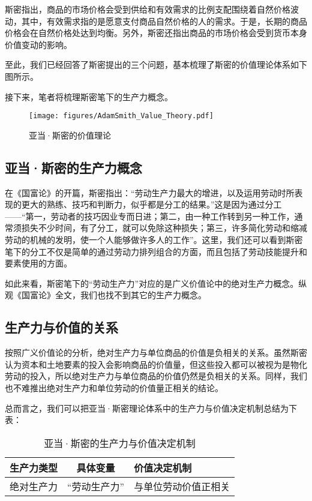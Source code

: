 斯密指出，商品的市场价格会受到供给和有效需求的比例支配围绕着自然价格波动，其中，有效需求指的是愿意支付商品自然价格的人的需求\cite[50]{YaDang*SiMiGuoFuLun2015}。于是，长期的商品价格会在自然价格处达到均衡\cite[50]{YaDang*SiMiGuoFuLun2015}。另外，斯密还指出商品的市场价格会受到货币本身价值变动的影响\cite[28-31]{YaDang*SiMiGuoFuLun2015}。

至此，我们已经回答了斯密提出的三个问题，基本梳理了斯密的价值理论体系如下图所示。

接下来，笔者将梳理斯密笔下的生产力概念。

\begin{figure}
    \centering
    \caption{亚当·斯密的价值理论}
    \label{figures:AdamSmith_Value_Theory}
    \texttt{[image: figures/AdamSmith\_Value\_Theory.pdf]}
\end{figure}

\subsection{亚当·斯密的生产力概念}

在《国富论》的开篇，斯密指出：“劳动生产力最大的增进，以及运用劳动时所表现的更大的熟练、技巧和判断力，似乎都是分工的结果。”\cite[3]{YaDang*SiMiGuoFuLun2015}这是因为通过分工——“第一，劳动者的技巧因业专而日进；第二，由一种工作转到另一种工作，通常须损失不少时间，有了分工，就可以免除这种损失；第三，许多简化劳动和缩减劳动的机械的发明，使一个人能够做许多人的工作”\cite[6]{YaDang*SiMiGuoFuLun2015}。这里，我们还可以看到斯密笔下的分工不仅是简单的通过劳动力排列组合的方面，而且包括了劳动技能提升和要素使用的方面。

如此来看，斯密笔下的“劳动生产力”对应的是广义价值论中的绝对生产力概念。纵观《国富论》全文，我们也找不到其它的生产力概念。

\subsection{生产力与价值的关系}

按照广义价值论的分析，绝对生产力与单位商品的价值是负相关的关系。虽然斯密认为资本和土地要素的投入会影响商品的价值量，但这些投入都可以被视为是物化劳动的投入，所以绝对生产力与单位商品的价值仍然是负相关的关系。同样，我们也不难推出绝对生产力和单位劳动的价值量正相关的结论。

总而言之，我们可以把亚当·斯密理论体系中的生产力与价值决定机制总结为下表：

\begin{table}
    \caption{亚当·斯密的生产力与价值决定机制}
    \label{table:AdamSmith}
     \begin{tabularx}{\textwidth}{|c<{\centering}|c<{\centering}|X<{\centering}|}
        \toprule
        生产力类型    &具体变量    &价值决定机制 \\ \midrule

        绝对生产力    &“劳动生产力”    &与单位劳动价值正相关 \\ \bottomrule
     \end{tabularx}
\end{table}

